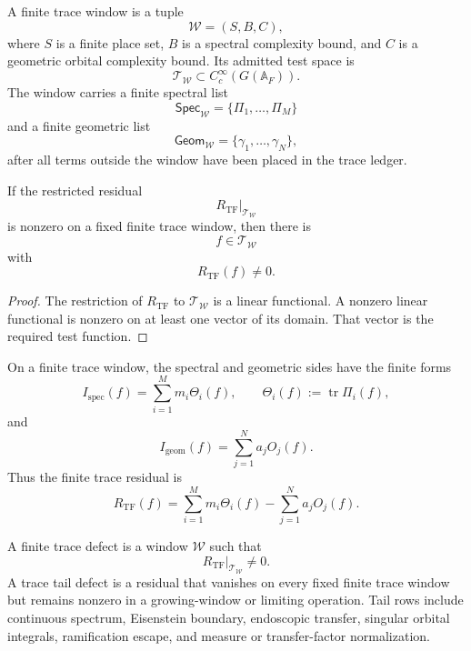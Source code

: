 \begin{definition}
\label{def:unified-reality-finite-trace-window}
A finite trace window is a tuple
$$
\mathcal W=(S,B,C),
$$
where $S$ is a finite place set, $B$ is a spectral complexity bound, and
$C$ is a geometric orbital complexity bound. Its admitted test space is
$$
\mathcal T_{\mathcal W}\subset C_c^\infty(G(\mathbb A_F)).
$$
The window carries a finite spectral list
$$
\mathsf{Spec}_{\mathcal W}=\{\Pi_1,\ldots,\Pi_M\}
$$
and a finite geometric list
$$
\mathsf{Geom}_{\mathcal W}=\{\gamma_1,\ldots,\gamma_N\},
$$
after all terms outside the window have been placed in the trace ledger.
\end{definition}

\begin{theorem}
\label{thm:unified-reality-finite-trace-residual-detection}
If the restricted residual
$$
R_{\mathrm{TF}}\vert_{\mathcal T_{\mathcal W}}
$$
is nonzero on a fixed finite trace window, then there is
$$
f\in\mathcal T_{\mathcal W}
$$
with
$$
R_{\mathrm{TF}}(f)\ne0.
$$
\end{theorem}
\begin{proof}
The restriction of $R_{\mathrm{TF}}$ to $\mathcal T_{\mathcal W}$ is a
linear functional. A nonzero linear functional is nonzero on at least one
vector of its domain. That vector is the required test function.
\end{proof}

\begin{definition}
\label{def:unified-reality-finite-trace-matrix-residual}
On a finite trace window, the spectral and geometric sides have the
finite forms
$$
I_{\mathrm{spec}}(f)
=
\sum_{i=1}^{M}m_i\Theta_i(f),
\qquad
\Theta_i(f):=\operatorname{tr}\Pi_i(f),
$$
and
$$
I_{\mathrm{geom}}(f)
=
\sum_{j=1}^{N}a_jO_j(f).
$$
Thus the finite trace residual is
$$
R_{\mathrm{TF}}(f)
=
\sum_{i=1}^{M}m_i\Theta_i(f)
-
\sum_{j=1}^{N}a_jO_j(f).
$$
\end{definition}

\begin{definition}
\label{def:unified-reality-trace-defect-dichotomy-rows}
A finite trace defect is a window $\mathcal W$ such that
$$
R_{\mathrm{TF}}\vert_{\mathcal T_{\mathcal W}}\ne0.
$$
A trace tail defect is a residual that vanishes on every fixed finite
trace window but remains nonzero in a growing-window or limiting
operation. Tail rows include continuous spectrum, Eisenstein boundary,
endoscopic transfer, singular orbital integrals, ramification escape,
and measure or transfer-factor normalization.
\end{definition}

